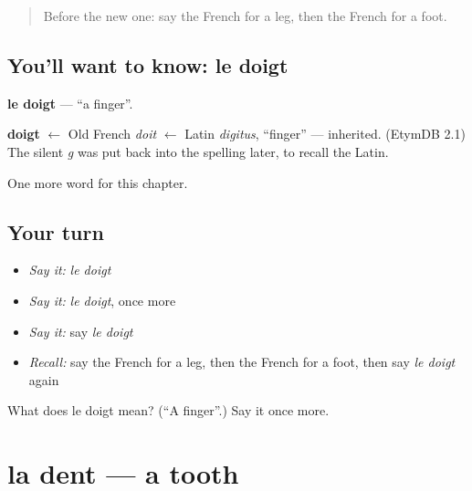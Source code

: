 \label{lesson:FR-C49-doigt}



\begin{quote}
Before the new one: say the French for a leg, then the French for a foot.
\end{quote}

\subsection*{You'll want to know: le doigt}
\textbf{le doigt} — \textquotedblleft{}a finger\textquotedblright{}.

\begin{cousinweb}
\textbf{doigt} $\leftarrow$ Old French \emph{doit} $\leftarrow$ Latin \emph{digitus}, \textquotedblleft{}finger\textquotedblright{} — inherited. (EtymDB 2.1) The silent \emph{g} was put back into the spelling later, to recall the Latin.
\end{cousinweb}

\begin{grammarlens}[title={What you've built}]
One more word for this chapter.
\end{grammarlens}

\subsection*{Your turn}
\begin{itemize}
\raggedright
  \item \emph{Say it:} \emph{le doigt}
  \item \emph{Say it:} \emph{le doigt}, once more
  \item \emph{Say it:} say \emph{le doigt}
  \item \emph{Recall:} say the French for a leg, then the French for a foot, then say \emph{le doigt} again
\end{itemize}

\begin{tcolorbox}[breakable,colback=teal!4,colframe=teal!35!black,title={Before you move on}]
What does le doigt mean? (\textquotedblleft{}A finger\textquotedblright{}.) Say it once more.
\end{tcolorbox}
\section[la dent]{la dent — a tooth}

\label{lesson:FR-C49-dent}



